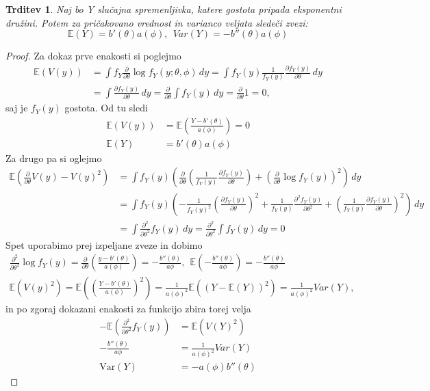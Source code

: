 \documentclass[12pt,a4paper]{amsart}
\theoremstyle{definition} %
\theoremstyle{plain} %
\newtheorem{trditev}[definicija]{Trditev}
\begin{document}
\begin{trditev} \label{izp}
    Naj bo Y slučajna spremenljivka, katere gostota pripada eksponentni družini. Potem za pričakovano vrednost in varianco veljata sledeči zvezi:
    \[
        \mathbb{E}(Y) = b'(\theta)a(\phi),~~Var(Y) = -b''(\theta)a(\phi)
    \]
\end{trditev}
\begin{proof}
Za dokaz prve enakosti si poglejmo
\begin{align*}
    \mathbb{E}(V(y)) &= \int f_{Y}\frac{\partial}{\partial \theta}\log f_{Y}(y;\theta,\phi) \,dy = \int f_{Y}(y)\frac{1}{f_{Y}(y)}\frac{\partial f_{Y}(y)}{\partial\theta}\,dy \nonumber\\
    &=\int\frac{\partial f_{Y}(y)}{\partial \theta} \,dy= \frac{\partial}{\partial \theta}\int f_{Y}(y)\,dy = \frac{\partial}{\partial \theta}1 = 0,
\end{align*}
saj je $f_{Y}(y)$ gostota.
Od tu sledi
\begin{align*}
    \mathbb{E}(V(y)) &= \mathbb{E}(\frac{Y - b'(\theta)}{a(\phi)}) = 0 \\
    \mathbb{E}(Y) &= b'(\theta)a(\phi)
\end{align*}
Za drugo pa si oglejmo
\begin{align*}
    \mathbb{E}(\frac{\partial}{\partial\theta}V(y) - V(y)^2) &= \int f_{Y}(y)\left(\frac{\partial}{\partial \theta} \left(\frac{1}{f_{Y}(y)}\frac{\partial f_{Y}(y)}{\partial\theta}\right) + \left(\frac{\partial}{\partial\theta}\log f_{Y}(y)\right)^2\right) \,dy \\
    &= \int f_{Y}(y)\left(-\frac{1}{f_{Y}(y)^2}\left(\frac{\partial f_{Y}(y)}{\partial\theta}\right)^2 + \frac{1}{f_{Y}(y)}\frac{\partial^2f_{Y}(y)}{\partial\theta^2} + \left(\frac{1}{f_{Y}(y)}\frac{\partial f_{Y}(y)}{\partial\theta}\right)^2  \right)\,dy \\
    &=\int \frac{\partial^2}{\partial\theta^2} f_{Y}(y) \,dy = \frac{\partial^2}{\partial\theta^2}\int f_{Y}(y)\,dy = 0
\end{align*}
Spet uporabimo prej izpeljane zveze in dobimo
\begin{gather*}
    \frac{\partial^2}{\partial\theta^2}\log f_{Y}(y) = \frac{\partial}{\partial\theta}\left(\frac{y-b'(\theta)}{a(\phi)}\right) = -\frac{b''(\theta)}{a\phi},~~\mathbb{E}\left(-\frac{b''(\theta)}{a\phi}\right) = -\frac{b''(\theta)}{a\phi} \\
    \mathbb{E}\left(V(y)^2\right) = \mathbb{E}\left(\left(\frac{Y-b'(\theta)}{a(\phi)}\right)^2\right) = \frac{1}{a(\phi)^2}\mathbb{E}((Y - \mathbb{E}(Y))^2) = \frac{1}{a(\phi)^2}Var(Y),
\end{gather*}
in po zgoraj dokazani enakosti za funkcijo zbira torej velja
\begin{align*}
    -\mathbb{E}\left(\frac{\partial^2}{\partial\theta^2}f_{Y}(y)\right) &= \mathbb{E}\left(V(Y)^2\right) \\
    -\frac{b''(\theta)}{a\phi} &= \frac{1}{a(\phi)^2}Var(Y) \\
    \mathrm{Var}(Y) &= -a(\phi)b''(\theta)
\end{align*}
\end{proof}
\end{document}
